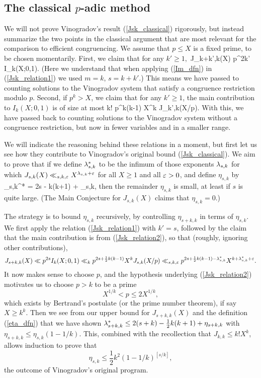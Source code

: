 \documentclass[brochure,english,12pt]{bourbaki}%
\begin{document}
\subsection{The classical $p$-adic method}

We will not prove Vinogradov's result (\ref{Jsk_classical}) rigorously, but instead summarize the two points in the classical argument that are most relevant for the comparison to efficient congruencing. 
We assume that $p \leq X$ is a fixed prime, to be chosen momentarily.
First, we claim that for any $k' \geq 1,$ 
\beq\label{Jsk_relation1}
 J_{k+k',k}(X) \leq p^{2k'} I_k(X;0,1).
\eeq
(Here we understand that when applying (\ref{Im_dfn}) in (\ref{Jsk_relation1}) we used $m=k$, $s=k+k'$.) This means we have passed to counting solutions to the Vinogradov system that satisfy a congruence restriction modulo $p$.
Second, if $p^k > X$, we claim that for any $k'\geq 1$, the main contribution to $I_k(X;0,1)$ is of size at most 
\beq\label{Jsk_relation2}
 k! p^{k(k-1)} X^k J_{k',k}(X/p).
 \eeq
 With this, we have passed back to counting solutions to the Vinogradov system without a congruence restriction, but now in fewer variables and in a smaller range.

We will indicate the reasoning behind these relations in a moment, but first let us see how they contribute to Vinogradov's original bound (\ref{Jsk_classical}). We  aim to prove that  if we define $\lambda_{s,k}^*$ to be the infimum of those exponents $\lambda_{s,k}$ for which $J_{s,k}(X) \ll_{s,k,\varepsilon} X^{\lambda_{s,k}+\varepsilon}$ for all $X \geq 1$ and all $\varepsilon>0$,  and define $\eta_{s,k}$ by 
\beq\label{eta_dfn}
 \lam_{s,k}^* = 2s - k(k+1) + \eta_{s,k},
 \eeq
then the remainder $\eta_{s,k}$ is small, at least if $s$ is quite large. (The Main Conjecture  for $J_{s,k}(X)$ claims that $\eta_{s,k}=0$.)

The strategy is to bound $\eta_{s,k}$ recursively, by controlling $\eta_{s+k,k}$ in terms of $\eta_{s,k}$. We first apply the relation (\ref{Jsk_relation1}) with $k'=s$, followed by the claim that the main contribution is from (\ref{Jsk_relation2}), so that  (roughly, ignoring other contributions),
\[ J_{s+k,k}(X) \ll p^{2s} I_k(X;0,1) \ll_k p^{2s + \frac{1}{2} k(k-1)} X^k J_{s,k}(X/p)
	\ll_{s,k,\varepsilon} p^{2s+\frac{1}{2}k(k-1)- \lambda_{s,k}^*} X^{k+ \lambda_{s,k}^*+\varepsilon}.\]
It now makes sense to choose $p$, and the hypothesis underlying (\ref{Jsk_relation2}) motivates us to choose $p>k$ to be a prime 
\[ X^{1/k} < p \leq 2X^{1/k},\]
which exists by Bertrand's postulate (or the prime number theorem), if say $X \geq k^k$.
Then we see from our upper bound for $J_{s+k,k}(X)$ and the definition (\ref{eta_dfn}) that 
we have shown $\lambda_{s+k,k}^* \leq 2(s+k) - \frac{1}{2}k(k+1) + \eta_{s+k,k}$ with $\eta_{s+k,k} \leq \eta_{s,k}(1-1/k)$. This, combined with the recollection that $J_{k,k} \leq k! X^{k}$, allows induction to prove that 
\[\eta_{s,k} \leq \frac{1}{2}k^2 (1-1/k)^{[s/k]},\]
 the outcome of Vinogradov's original program.
\end{document}
